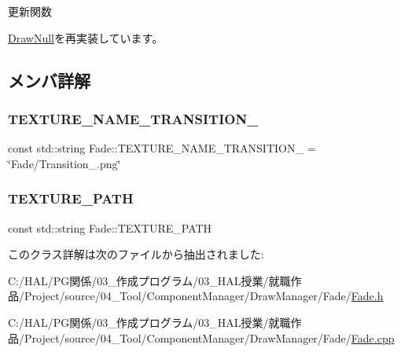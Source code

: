更新関数 



\mbox{\hyperlink{class_draw_null_a0149bcf84a34b138642ab7975ae46f30}{Draw\+Null}}を再実装しています。



\subsection{メンバ詳解}
\mbox{\label{class_fade_ab5d6f86f07e33205224fa486ff22c51d}} 
\subsubsection{\texorpdfstring{T\+E\+X\+T\+U\+R\+E\+\_\+\+N\+A\+M\+E\+\_\+\+T\+R\+A\+N\+S\+I\+T\+I\+O\+N\+\_}{TEXTURE\_NAME\_TRANSITION\_01}}
{\footnotesize\ttfamily const std\+::string Fade\+::\+T\+E\+X\+T\+U\+R\+E\+\_\+\+N\+A\+M\+E\+\_\+\+T\+R\+A\+N\+S\+I\+T\+I\+O\+N\+\_ = \char`\"{}Fade/Transition\+\_.\+png\char`\"{}\hspace{0.3cm}{\ttfamily [static]}}

\mbox{\label{class_fade_acd9c0d6231180af183d6301f31fa0053}} 
\subsubsection{\texorpdfstring{T\+E\+X\+T\+U\+R\+E\+\_\+\+P\+A\+TH}{TEXTURE\_PATH}}
{\footnotesize\ttfamily const std\+::string Fade\+::\+T\+E\+X\+T\+U\+R\+E\+\_\+\+P\+A\+TH\hspace{0.3cm}{\ttfamily [static]}}



このクラス詳解は次のファイルから抽出されました\+:\begin{DoxyCompactItemize}
\item 
C\+:/\+H\+A\+L/\+P\+G関係/03\+\_\+作成プログラム/03\+\_\+\+H\+A\+L授業/就職作品/\+Project/source/04\+\_\+\+Tool/\+Component\+Manager/\+Draw\+Manager/\+Fade/\mbox{\hyperlink{_fade_8h}{Fade.\+h}}\item 
C\+:/\+H\+A\+L/\+P\+G関係/03\+\_\+作成プログラム/03\+\_\+\+H\+A\+L授業/就職作品/\+Project/source/04\+\_\+\+Tool/\+Component\+Manager/\+Draw\+Manager/\+Fade/\mbox{\hyperlink{_fade_8cpp}{Fade.\+cpp}}\end{DoxyCompactItemize}
